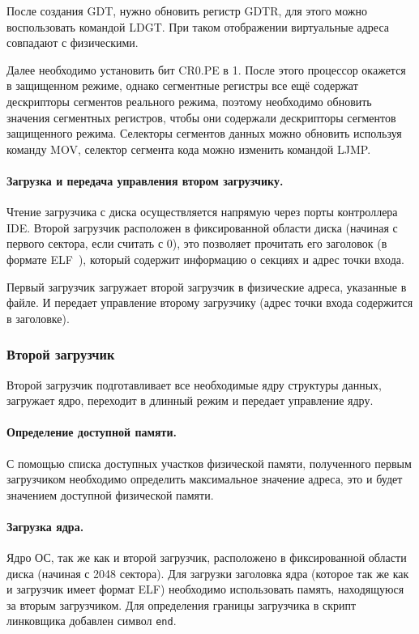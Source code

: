 После создания GDT, нужно обновить регистр GDTR, для этого можно воспользовать командой LDGT.
При таком отображении виртуальные адреса совпадают с физическими.

Далее необходимо установить бит CR0.PE в 1. После этого процессор окажется в защищенном режиме,
однако сегментные регистры все ещё содержат дескрипторы сегментов реального режима, поэтому необходимо
обновить значения сегментных регистров, чтобы они содержали дескрипторы сегментов защищенного
режима. Селекторы сегментов данных можно обновить используя команду MOV, селектор сегмента кода
можно изменить командой LJMP.

\paragraph{Загрузка и передача управления втором загрузчику.} Чтение загрузчика с диска
осуществляется напрямую через порты контроллера IDE. Второй загрузчик расположен в фиксированной
области диска (начиная с первого сектора, если считать с 0), это позволяет прочитать его заголовок
(в формате ELF~\cite{elf}), который содержит информацию о секциях и адрес точки входа.

Первый загрузчик загружает второй загрузчик в физические адреса, указанные в файле. И передает
управление второму загрузчику (адрес точки входа содержится в заголовке).


\subsubsection*{Второй загрузчик}
Второй загрузчик подготавливает все необходимые ядру структуры данных, загружает ядро,
переходит в длинный режим и передает управление ядру.

\paragraph{Определение доступной памяти.} С помощью списка доступных участков физической
памяти, полученного первым загрузчиком необходимо определить максимальное значение адреса,
это и будет значением доступной физической памяти.

\paragraph{Загрузка ядра.} Ядро ОС, так же как и второй загрузчик, расположено в фиксированной
области диска (начиная с 2048 сектора). Для загрузки заголовка ядра (которое так же как и
загрузчик имеет формат ELF) необходимо использовать память, находящуюся за вторым загрузчиком.
Для определения границы загрузчика в скрипт линковщика добавлен символ \texttt{end}.

